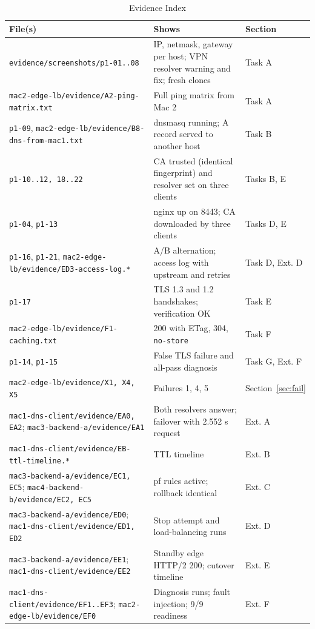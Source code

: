 \documentclass[conference,a4paper]{IEEEtran}
\newcommand{\code}[1]{\texttt{#1}}
\begin{document}
\begin{table}[t]
\caption{Evidence Index}
\label{tab:evid}
\centering\footnotesize
\begin{tabularx}{\textwidth}{@{}P{5.6cm}LP{2.8cm}@{}}
\toprule
\textbf{File(s)} & \textbf{Shows} & \textbf{Section}\\
\midrule
\code{evidence/screenshots/p1-01..08} & IP, netmask, gateway per host; VPN resolver warning and fix; fresh clones & Task A\\
\code{mac2-edge-lb/evidence/A2-ping-matrix.txt} & Full ping matrix from Mac 2 & Task A\\
\code{p1-09}, \code{mac2-edge-lb/evidence/B8-dns-from-mac1.txt} & dnsmasq running; A record served to another host & Task B\\
\code{p1-10..12, 18..22} & CA trusted (identical fingerprint) and resolver set on three clients & Tasks B, E\\
\code{p1-04}, \code{p1-13} & nginx up on 8443; CA downloaded by three clients & Tasks D, E\\
\code{p1-16}, \code{p1-21}, \code{mac2-edge-lb/evidence/ED3-access-log.*} & A/B alternation; access log with upstream and retries & Task D, Ext. D\\
\code{p1-17} & TLS 1.3 and 1.2 handshakes; verification OK & Task E\\
\code{mac2-edge-lb/evidence/F1-caching.txt} & 200 with ETag, 304, \code{no-store} & Task F\\
\code{p1-14}, \code{p1-15} & False TLS failure and all-pass diagnosis & Task G, Ext. F\\
\code{mac2-edge-lb/evidence/X1, X4, X5} & Failures 1, 4, 5 & Section~\ref{sec:fail}\\
\code{mac1-dns-client/evidence/EA0, EA2}; \code{mac3-backend-a/evidence/EA1} & Both resolvers answer; failover with 2.552 s request & Ext. A\\
\code{mac1-dns-client/evidence/EB-ttl-timeline.*} & TTL timeline & Ext. B\\
\code{mac3-backend-a/evidence/EC1, EC5}; \code{mac4-backend-b/evidence/EC2, EC5} & pf rules active; rollback identical & Ext. C\\
\code{mac3-backend-a/evidence/ED0}; \code{mac1-dns-client/evidence/ED1, ED2} & Stop attempt and load-balancing runs & Ext. D\\
\code{mac3-backend-a/evidence/EE1}; \code{mac1-dns-client/evidence/EE2} & Standby edge HTTP/2 200; cutover timeline & Ext. E\\
\code{mac1-dns-client/evidence/EF1..EF3}; \code{mac2-edge-lb/evidence/EF0} & Diagnosis runs; fault injection; 9/9 readiness & Ext. F\\
\bottomrule
\end{tabularx}
\end{table}
\end{document}
